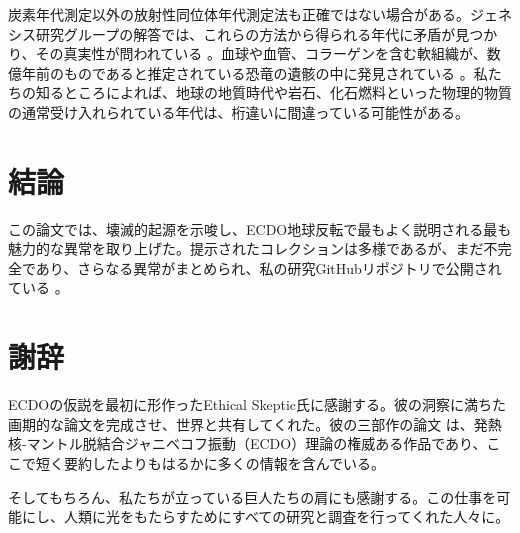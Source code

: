 \documentclass[10pt,twocolumn,letterpaper]{article}
\begin{document}
炭素年代測定以外の放射性同位体年代測定法も正確ではない場合がある。ジェネシス研究グループの解答では、これらの方法から得られる年代に矛盾が見つかり、その真実性が問われている \cite{108}。血球や血管、コラーゲンを含む軟組織が、数億年前のものであると推定されている恐竜の遺骸の中に発見されている \cite{109,110}。私たちの知るところによれば、地球の地質時代や岩石、化石燃料といった物理的物質の通常受け入れられている年代は、桁違いに間違っている可能性がある。

\section{結論}

この論文では、壊滅的起源を示唆し、ECDO地球反転で最もよく説明される最も魅力的な異常を取り上げた。提示されたコレクションは多様であるが、まだ不完全であり、さらなる異常がまとめられ、私の研究GitHubリポジトリで公開されている \cite{2}。

\section{謝辞}

ECDOの仮説を最初に形作ったEthical Skeptic氏に感謝する。彼の洞察に満ちた画期的な論文を完成させ、世界と共有してくれた。彼の三部作の論文 \cite{1} は、発熱核-マントル脱結合ジャニベコフ振動（ECDO）理論の権威ある作品であり、ここで短く要約したよりもはるかに多くの情報を含んでいる。

そしてもちろん、私たちが立っている巨人たちの肩にも感謝する。この仕事を可能にし、人類に光をもたらすためにすべての研究と調査を行ってくれた人々に。

{\small


}
\end{document}
